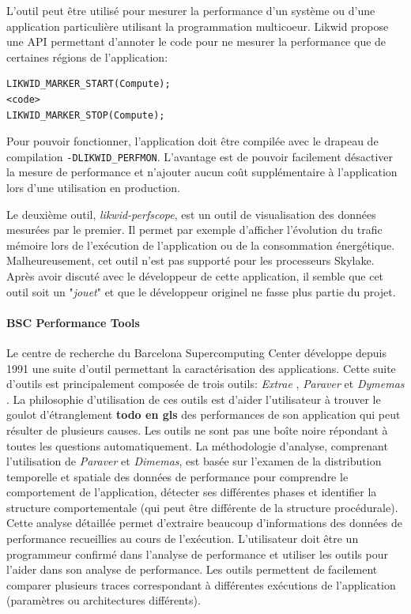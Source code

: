             L'outil peut être utilisé pour mesurer la performance d'un système ou d'une application particulière utilisant la programmation multicoeur. 
        Likwid propose une API permettant d'annoter le code pour ne mesurer la performance que de certaines régions de l'application:
\begin{lstlisting}
LIKWID_MARKER_START(Compute);
<code>
LIKWID_MARKER_STOP(Compute);
\end{lstlisting}
            Pour pouvoir fonctionner, l'application doit être compilée avec le drapeau de compilation \verb|-DLIKWID_PERFMON|. L'avantage est de pouvoir facilement désactiver la mesure de performance et n'ajouter aucun coût supplémentaire à l'application lors d'une utilisation en production.
        
        
            Le deuxième outil, \textit{likwid-perfscope}, est un outil de visualisation des données mesurées par le premier. Il permet par exemple d'afficher l'évolution du trafic mémoire lors de l'exécution de l'application ou de la consommation énergétique. Malheureusement, cet outil n'est pas supporté pour les processeurs Skylake. Après avoir discuté avec le développeur de cette application, il semble que cet outil soit un "\textit{jouet}" et que le développeur originel ne fasse plus partie du projet.
            
           
        \paragraph{BSC Performance Tools}
            Le centre de recherche du Barcelona Supercomputing Center développe depuis 1991 une suite d'outil permettant la caractérisation des applications. Cette suite d'outils est principalement composée de trois outils: \textit{Extrae} \cite{Rodriguez}, \textit{Paraver} \cite{Pillet1995} et \textit{Dymemas} \cite{Labarta1997}. La philosophie d'utilisation de ces outils est d'aider l'utilisateur à trouver le goulot d'étranglement \textbf{todo en gls} des performances de son application qui peut résulter de plusieurs causes. Les outils ne sont pas une boîte noire répondant à toutes les questions automatiquement. La méthodologie d'analyse, comprenant l'utilisation de \textit{Paraver} et \textit{Dimemas}, est basée sur l'examen de la distribution temporelle et spatiale des données de performance pour comprendre le comportement de l'application, détecter ses différentes phases et identifier la structure comportementale (qui peut être différente de la structure procédurale). Cette analyse détaillée permet d'extraire beaucoup d'informations des données de performance recueillies au cours de l'exécution. L'utilisateur doit être un programmeur confirmé dans l'analyse de performance et utiliser les outils pour l'aider dans son analyse de performance. Les outils permettent de facilement comparer plusieurs traces correspondant à différentes exécutions de l'application (paramètres ou architectures différents). 
            

